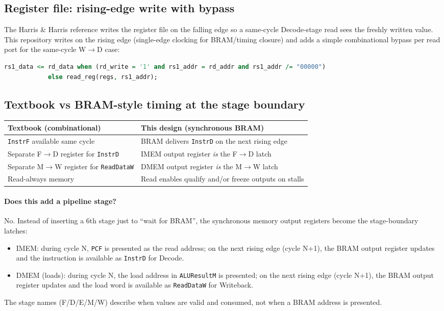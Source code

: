 \subsection{Register file: rising-edge write with bypass}
The Harris \& Harris reference writes the register file on the falling edge so
a same-cycle Decode-stage read sees the freshly written value. This repository
writes on the rising edge (single-edge clocking for BRAM/timing closure) and
adds a simple combinational bypass per read port for the same-cycle
W$\rightarrow$D case:

\begin{lstlisting}[style=minrv,language=VHDL]
rs1_data <= rd_data when (rd_write = '1' and rs1_addr = rd_addr and rs1_addr /= "00000")
            else read_reg(regs, rs1_addr);
\end{lstlisting}

\subsection{Textbook vs BRAM-style timing at the stage boundary}
\begin{center}
\small
\begin{tabular}{@{}p{}p{}@{}}
\toprule
Textbook (combinational) & This design (synchronous BRAM) \\
\midrule
\texttt{InstrF} available same cycle & BRAM delivers \texttt{InstrD} on the next rising edge \\
Separate F$\rightarrow$D register for \texttt{InstrD} & IMEM output register \emph{is} the F$\rightarrow$D latch \\
Separate M$\rightarrow$W register for \texttt{ReadDataW} & DMEM output register \emph{is} the M$\rightarrow$W latch \\
Read-always memory & Read enables qualify and/or freeze outputs on stalls \\
\bottomrule
\end{tabular}
\end{center}
\normalsize

\paragraph{Does this add a pipeline stage?}
No. Instead of inserting a 6th stage just to ``wait for BRAM'', the synchronous
memory output registers become the stage-boundary latches:
\begin{itemize}[leftmargin=*]
  \item IMEM: during cycle N, \texttt{PCF} is presented as the read address; on
        the next rising edge (cycle N+1), the BRAM output register updates and
        the instruction is available as \texttt{InstrD} for Decode.
  \item DMEM (loads): during cycle N, the load address in \texttt{ALUResultM} is
        presented; on the next rising edge (cycle N+1), the BRAM output register
        updates and the load word is available as \texttt{ReadDataW} for
        Writeback.
\end{itemize}
\noindent
The stage names (F/D/E/M/W) describe when values are valid and consumed, not
when a BRAM address is presented.

